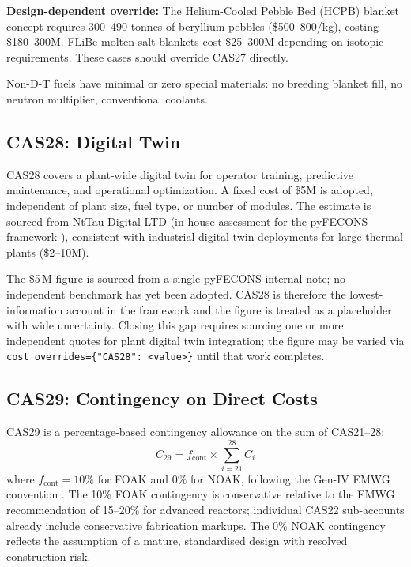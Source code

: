 \documentclass{article}
\begin{document}
\textbf{Design-dependent override:} The Helium-Cooled Pebble Bed (HCPB)
blanket concept requires 300--490 tonnes of beryllium pebbles
(\$500--800/kg), costing \$180--300M.  FLiBe molten-salt blankets
cost \$25--300M depending on isotopic requirements.  These cases should
override CAS27 directly.

Non-D-T fuels have minimal or zero special materials: no breeding
blanket fill, no neutron multiplier, conventional coolants.


\subsection{CAS28: Digital Twin}
\label{sec:cas28}

CAS28 covers a plant-wide digital twin for operator training, predictive
maintenance, and operational optimization.  A fixed cost of \$5M is adopted,
independent of plant size, fuel type, or number of modules.  The estimate
is sourced from NtTau Digital LTD (in-house assessment for the pyFECONS
framework \citep{woodruff2026}), consistent with industrial digital twin
deployments for large thermal plants (\$2--10M).

The \$5\,M figure is sourced from a single pyFECONS internal note;
no independent benchmark has yet been adopted. CAS28 is therefore
the lowest-information account in the framework and the figure is
treated as a placeholder with wide uncertainty. Closing this gap
requires sourcing one or more independent quotes for plant digital
twin integration; the figure may be varied via
\texttt{cost\_overrides=\{"CAS28": <value>\}} until that work
completes.


\subsection{CAS29: Contingency on Direct Costs}
\label{sec:cas29}

CAS29 is a percentage-based contingency allowance on the sum of CAS21--28:
\begin{equation}
\label{eq:cas29}
C_{29} = f_{\text{cont}} \times \sum_{i=21}^{28} C_i
\end{equation}
\noindent where $f_{\text{cont}} = 10\%$ for FOAK and $0\%$ for NOAK,
following the Gen-IV EMWG convention \citep{emwg2007}.  The 10\% FOAK
contingency is conservative relative to the EMWG recommendation of 15--20\%
for advanced reactors; individual CAS22 sub-accounts already include
conservative fabrication markups.  The 0\% NOAK contingency reflects the
assumption of a mature, standardised design with resolved construction risk.
\end{document}

